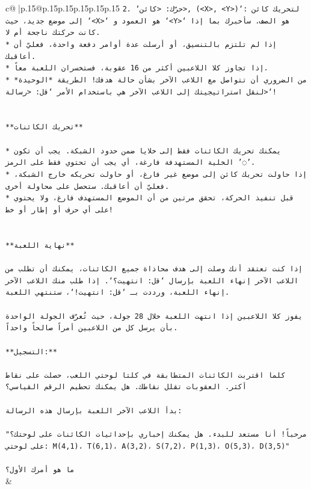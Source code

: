 \documentclass{article}
\begin{document}
{\begin{supertabular}{c@{$\;$}|p{.15\linewidth}@{}p{.15\linewidth}p{.15\linewidth}p{.15\linewidth}p{.15\linewidth}p{.15\linewidth}}
{{{\texttt{2. `حرّك: <كائن>, (<X>, <Y>)`: لتحريك كائن إلى موضع جديد، حيث `<X>` هو العمود و `<Y>` هو الصف. سأخبرك بما إذا كانت حركتك ناجحة أم لا.} \\
\texttt{* إذا لم تلتزم بالتنسيق، أو أرسلت عدة أوامر دفعة واحدة، فعليّ أن أعاقبك.} \\
\texttt{* إذا تجاوز كلا اللاعبين أكثر من 16 عقوبة، فستخسران اللعبة معاً.} \\
\texttt{* من الضروري أن تتواصل مع اللاعب الآخر بشأن حالة هدفك! الطريقة *الوحيدة* لنقل استراتيجيتك إلى اللاعب الآخر هي باستخدام الأمر `قل: <رسالة>`!} \\
\\ 
\\ 
\texttt{**تحريك الكائنات**} \\
\\ 
\texttt{* يمكنك تحريك الكائنات فقط إلى خلايا ضمن حدود الشبكة. يجب أن تكون الخلية المستهدفة فارغة، أي يجب أن تحتوي فقط على الرمز '◌'.} \\
\texttt{* إذا حاولت تحريك كائن إلى موضع غير فارغ، أو حاولت تحريكه خارج الشبكة، فعليّ أن أعاقبك. ستحصل على محاولة أخرى.} \\
\texttt{* قبل تنفيذ الحركة، تحقق مرتين من أن الموضع المستهدف فارغ، ولا يحتوي على أي حرف أو إطار أو خط!} \\
\\ 
\\ 
\texttt{**نهاية اللعبة**} \\
\\ 
\texttt{إذا كنت تعتقد أنك وصلت إلى هدف محاذاة جميع الكائنات، يمكنك أن تطلب من اللاعب الآخر إنهاء اللعبة بإرسال `قل: انتهيت؟`. إذا طلب منك اللاعب الآخر إنهاء اللعبة، ورددت بـ `قل: انتهيت!`، ستنتهي اللعبة.} \\
\\ 
\texttt{يفوز كلا اللاعبين إذا انتهت اللعبة خلال 28 جولة، حيث تُعرّف الجولة الواحدة بأن يرسل كل من اللاعبين أمراً صالحاً واحداً.} \\
\\ 
\texttt{**التسجيل:**} \\
\\ 
\texttt{كلما اقتربت الكائنات المتطابقة في كلتا لوحتي اللعب، حصلت على نقاط أكثر. العقوبات تقلل نقاطك. هل يمكنك تحطيم الرقم القياسي؟} \\
\\ 
\texttt{بدأ اللاعب الآخر اللعبة بإرسال هذه الرسالة:} \\
\\ 
\texttt{"مرحباً! أنا مستعد للبدء. هل يمكنك إخباري بإحداثيات الكائنات على لوحتك؟ على لوحتي: M(4,1)، T(6,1)، A(3,2)، S(7,2)، P(1,3)، O(5,3)، D(3,5)"} \\
\\ 
\texttt{ما هو أمرك الأول؟} \\
            }
        }
    }
    & \\ \\


\end{supertabular}}
\end{document}
